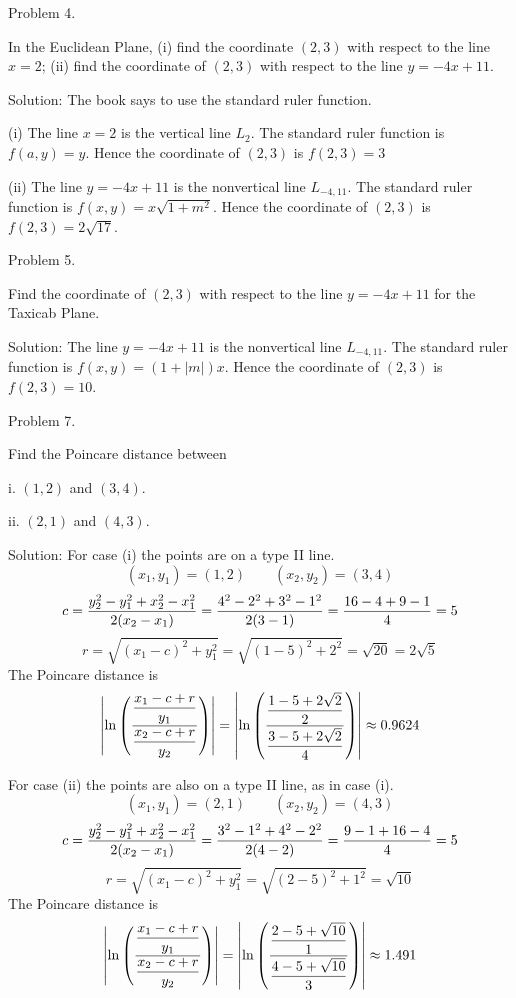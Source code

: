 \beginsection Problem 4.

In the Euclidean Plane, (i) find the coordinate $(2,3)$ with respect
to the line $x=2$;
(ii) find the coordinate of $(2,3)$ with respect to the line $y=-4x+11$.

\medskip
Solution: The book says to use the standard ruler function.

\medskip
(i) The line $x=2$ is the vertical line $L_2$.
The standard ruler function is $f(a,y)=y$.
Hence the coordinate of $(2,3)$ is $f(2,3)=3$

\medskip
(ii) The line $y=-4x+11$ is the nonvertical line $L_{-4,11}$.
The standard ruler function is $f(x,y)=x\sqrt{1+m^2}$.
Hence the coordinate of $(2,3)$ is $f(2,3)=2\sqrt{17}$.

\beginsection Problem 5.

Find the coordinate of $(2,3)$ with respect to the line
$y=-4x+11$ for the Taxicab Plane.

\medskip
Solution: 
The line $y=-4x+11$ is the nonvertical line $L_{-4,11}$.
The standard ruler function is $f(x,y)=(1+|m|)x$.
Hence the coordinate of $(2,3)$ is $f(2,3)=10$.

\beginsection Problem 7.

Find the Poincare distance between
\item{i.} $(1,2)$ and $(3,4)$.
\item{ii.} $(2,1)$ and $(4,3)$.

\medskip
Solution: For case (i) the points are on a type II line.
$$(x_1,y_1)=(1,2)\qquad(x_2,y_2)=(3,4)$$
$$c={y_2^2-y_1^2+x_2^2-x_1^2\over2(x_2-x_1)}={4^2-2^2+3^2-1^2\over2(3-1)}
={16-4+9-1\over4}=5$$
$$r=\sqrt{(x_1-c)^2+y_1^2}=\sqrt{(1-5)^2+2^2}=\sqrt{20}=2\sqrt5$$
The Poincare distance is
$$
\left|
\ln
\left({
\displaystyle{x_1-c+r\over y_1}
\over
\displaystyle{x_2-c+r\over y_2}
}\right)
\right|
=
\left|
\ln
\left({
\displaystyle{1-5+2\sqrt2\over2}
\over
\displaystyle{3-5+2\sqrt2\over4}
}\right)
\right|
\approx0.9624
$$

For case (ii) the points are also on a type II line, as in case (i).
$$(x_1,y_1)=(2,1)\qquad(x_2,y_2)=(4,3)$$
$$c={y_2^2-y_1^2+x_2^2-x_1^2\over2(x_2-x_1)}={3^2-1^2+4^2-2^2\over2(4-2)}
={9-1+16-4\over4}=5$$
$$r=\sqrt{(x_1-c)^2+y_1^2}=\sqrt{(2-5)^2+1^2}=\sqrt{10}$$
The Poincare distance is
$$
\left|
\ln
\left({
\displaystyle{x_1-c+r\over y_1}
\over
\displaystyle{x_2-c+r\over y_2}
}\right)
\right|
=
\left|
\ln
\left({
\displaystyle{2-5+\sqrt{10}\over1}
\over
\displaystyle{4-5+\sqrt{10}\over3}
}\right)
\right|
\approx1.491
$$

